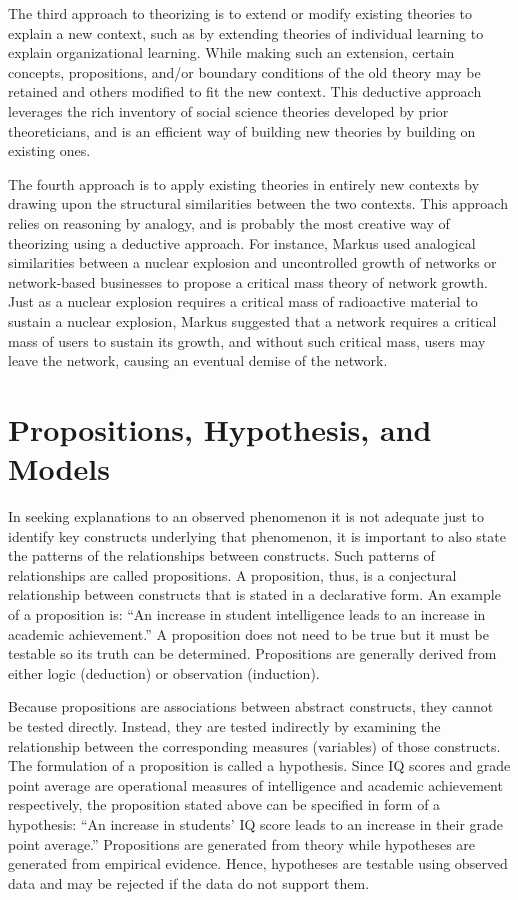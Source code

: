 The third approach to theorizing is to extend or modify existing theories to explain a new context, such as by extending theories of individual learning to explain organizational learning. While making such an extension, certain concepts, propositions, and/or boundary conditions of the old theory may be retained and others modified to fit the new context. This deductive approach leverages the rich inventory of social science theories developed by prior theoreticians, and is an efficient way of building new theories by building on existing ones.

The fourth approach is to apply existing theories in entirely new contexts by drawing upon the structural similarities between the two contexts. This approach relies on reasoning by analogy, and is probably the most creative way of theorizing using a deductive approach. For instance, Markus\cite{markus1987toward} used analogical similarities between a nuclear explosion and uncontrolled growth of networks or network-based businesses to propose a critical mass theory of network growth. Just as a nuclear explosion requires a critical mass of radioactive material to sustain a nuclear explosion, Markus suggested that a network requires a critical mass of users to sustain its growth, and without such critical mass, users may leave the network, causing an eventual demise of the network.

\section{Propositions, Hypothesis, and Models}

In seeking explanations to an observed phenomenon it is not adequate just to identify key constructs underlying that phenomenon, it is important to also state the patterns of the relationships between constructs. Such patterns of relationships are called propositions. A proposition, thus, is a conjectural relationship between constructs that is stated in a declarative form. An example of a proposition is: ``An increase in student intelligence leads to an increase in academic achievement.'' A proposition does not need to be true but it must be testable so its truth can be determined. Propositions are generally derived from either logic (deduction) or observation (induction).

Because propositions are associations between abstract constructs, they cannot be tested directly. Instead, they are tested indirectly by examining the relationship between the corresponding measures (variables) of those constructs. The formulation of a proposition is called a \gls{hypothesis}. Since IQ scores and grade point average are operational measures of intelligence and academic achievement respectively, the proposition stated above can be specified in form of a hypothesis: ``An increase in students' IQ score leads to an increase in their grade point average.'' Propositions are generated from theory while hypotheses are generated from empirical evidence. Hence, hypotheses are testable using observed data and may be rejected if the data do not support them. 


